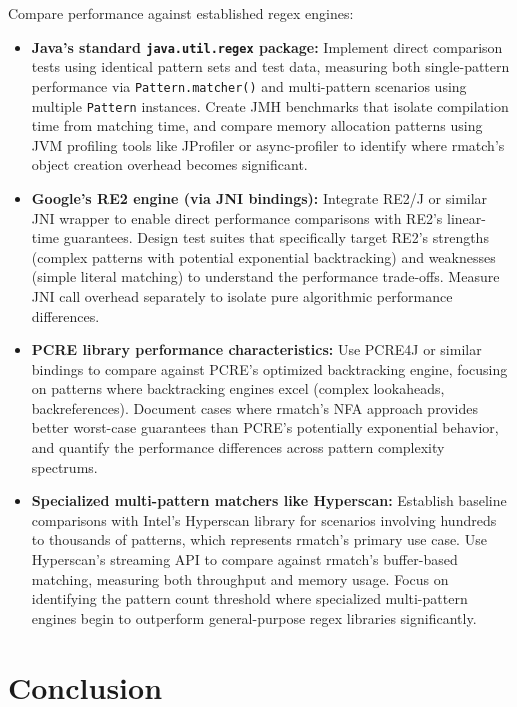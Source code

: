 \documentclass[11pt,a4paper]{article}
\begin{document}
Compare performance against established regex engines:
\begin{itemize}
\item \textbf{Java's standard \texttt{java.util.regex} package:} Implement direct comparison tests using identical pattern sets and test data, measuring both single-pattern performance via \texttt{Pattern.matcher()} and multi-pattern scenarios using multiple \texttt{Pattern} instances. Create JMH benchmarks that isolate compilation time from matching time, and compare memory allocation patterns using JVM profiling tools like JProfiler or async-profiler to identify where rmatch's object creation overhead becomes significant.

\item \textbf{Google's RE2 engine (via JNI bindings):} Integrate RE2/J or similar JNI wrapper to enable direct performance comparisons with RE2's linear-time guarantees. Design test suites that specifically target RE2's strengths (complex patterns with potential exponential backtracking) and weaknesses (simple literal matching) to understand the performance trade-offs. Measure JNI call overhead separately to isolate pure algorithmic performance differences.

\item \textbf{PCRE library performance characteristics:} Use PCRE4J or similar bindings to compare against PCRE's optimized backtracking engine, focusing on patterns where backtracking engines excel (complex lookaheads, backreferences). Document cases where rmatch's NFA approach provides better worst-case guarantees than PCRE's potentially exponential behavior, and quantify the performance differences across pattern complexity spectrums.

\item \textbf{Specialized multi-pattern matchers like Hyperscan:} Establish baseline comparisons with Intel's Hyperscan library for scenarios involving hundreds to thousands of patterns, which represents rmatch's primary use case. Use Hyperscan's streaming API to compare against rmatch's buffer-based matching, measuring both throughput and memory usage. Focus on identifying the pattern count threshold where specialized multi-pattern engines begin to outperform general-purpose regex libraries significantly.
\end{itemize}

\section{Conclusion}
\end{document}
